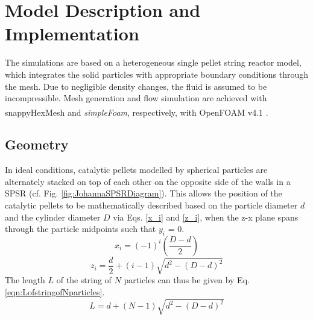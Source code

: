 \chapter{Model Description and Implementation}
\label{ch:03_Model_Description}
The simulations are based on a heterogeneous single pellet string reactor model, which integrates the solid particles with appropriate boundary conditions through the mesh. Due to negligible density changes, the fluid is assumed to be incompressible. Mesh generation and flow simulation are achieved with snappyHexMesh and \emph{simpleFoam}, respectively, with OpenFOAM\textsuperscript{\textregistered} v4.1 \cite{Tabor1998}.
\section{Geometry}
In ideal conditions, catalytic pellets modelled by spherical particles are alternately stacked on top of each other on the opposite side of the walls in a SPSR (cf. Fig. \ref{fig:JohannaSPSRDiagram}). This allows the position of the catalytic pellets to be mathematically described based on the particle diameter $d$ and the cylinder diameter $D$ via Eqs. \ref{x_i} and \ref{z_i}, when the z-x plane spans through the particle midpoints such that $y_i$ = 0.
\begin{equation}\label{x_i}
x_i = (-1)^i\left(\frac{D-d}{2}\right)
\end{equation}
\begin{equation}\label{z_i}
z_i = \frac{d}{2}+(i-1)\sqrt{d^2-(D-d)^2}
\end{equation}
The length $L$ of the string of $N$ particles can thus be given by Eq. \ref{eqn:LofstringofNparticles}.
\begin{equation}\label{eqn:LofstringofNparticles}
L = d + (N-1)\sqrt{d^2-(D-d)^2}
\end{equation}
\newpage

